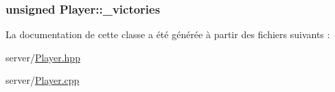 \subsubsection[{\+\_\+victories}]{\setlength{\rightskip}{0pt plus 5cm}unsigned Player\+::\+\_\+victories\hspace{0.3cm}{\ttfamily [protected]}}\label{classPlayer_aa9529e5da5724425ef1e94fb3f5b791f}


La documentation de cette classe a été générée à partir des fichiers suivants \+:\begin{DoxyCompactItemize}
\item 
server/\hyperlink{Player_8hpp}{Player.\+hpp}\item 
server/\hyperlink{Player_8cpp}{Player.\+cpp}\end{DoxyCompactItemize}
